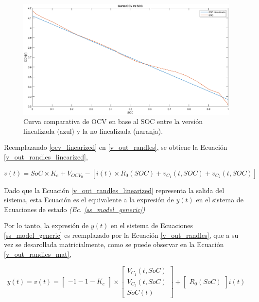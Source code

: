 \documentclass[10pt, a4paper]{report}
\begin{document}
\begin{figure}[h!]
    \begin{center}
	\includegraphics[width=1\textwidth]{SOC_vs_OCV.eps}
    \caption{Curva comparativa de \acrshort{OCV} en base al \acrshort{SOC} 
    entre la versi\'on linealizada (azul) y la no-linealizada (naranja).} 
	\label{soc_linealized}
    \end{center}
\end{figure}
\FloatBarrier

Reemplazando \ref{ocv_linearized} en \ref{v_out_randles}, se obtiene la
Ecuaci\'on \ref{v_out_randles_linearized},

\begin{equation}
    v(t) = SoC \times K_e + V_{OCV_0} - \left[i(t) \times R_0\left(SOC\right) 
        + v_{C_1}\left(t, SOC\right) + v_{C_2}\left(t, SOC\right)\right] 
    \label{v_out_randles_linearized}
\end{equation}

Dado que la Ecuaci\'on \ref{v_out_randles_linearized} representa la salida del 
sistema, esta Ecuaci\'on es el equivalente a la expresi\'on de $y(t)$ en el 
sistema de Ecuaciones de estado \emph{(Ec. \ref{ss_model_generic})}

Por lo tanto, la expresi\'on de $y(t)$ en el sistema de Ecuaciones
\ref{ss_model_generic} es reemplazado por la Ecuaci\'on \ref{v_out_randles}, que
a su vez se desarollada matricialmente, como se puede observar en la
Ecuaci\'on \ref{v_out_randles_mat},

\begin{equation}
    y(t) = v(t) = \begin{bmatrix} -1 -1 -K_e \end{bmatrix} \times 
    \begin{bmatrix} V_{C_1}(t, SoC) \\ V_{C_2}(t, SoC) \\ SoC(t) \end{bmatrix} +
    \begin{bmatrix} R_0(SoC) \end{bmatrix} i(t)\label{v_out_randles_mat}
\end{equation}
\end{document}
